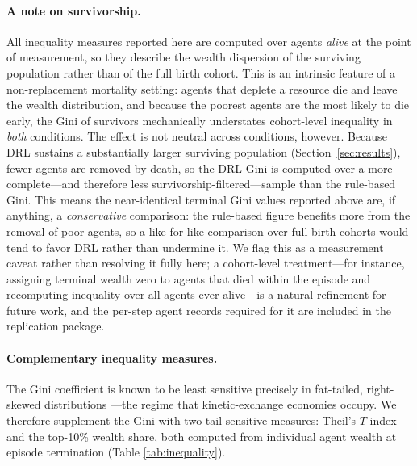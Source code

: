\documentclass[pdflatex,sn-mathphys-num]{sn-jnl}%
\theoremstyle{thmstyleone}%
\theoremstyle{thmstyletwo}%
\theoremstyle{thmstylethree}%
\begin{document}
\paragraph{A note on survivorship.}
All inequality measures reported here are computed over agents \emph{alive} at the point of measurement, so they describe the wealth dispersion of the surviving population rather than of the full birth cohort.  
This is an intrinsic feature of a non-replacement mortality setting: agents that deplete a resource die and leave the wealth distribution, and because the poorest agents are the most likely to die early, the Gini of survivors mechanically understates cohort-level inequality in \emph{both} conditions.  
The effect is not neutral across conditions, however.  
Because DRL sustains a substantially larger surviving population (Section~\ref{sec:results}), fewer agents are removed by death, so the DRL Gini is computed over a more complete---and therefore less survivorship-filtered---sample than the rule-based Gini.  
This means the near-identical terminal Gini values reported above are, if anything, a \emph{conservative} comparison: the rule-based figure benefits more from the removal of poor agents, so a like-for-like comparison over full birth cohorts would tend to favor DRL rather than undermine it.  
We flag this as a measurement caveat rather than resolving it fully here; a cohort-level treatment---for instance, assigning terminal wealth zero to agents that died within the episode and recomputing inequality over all agents ever alive---is a natural refinement for future work, and the per-step agent records required for it are included in the replication package.

\paragraph{Complementary inequality measures.}
The Gini coefficient is known to be least sensitive precisely in fat-tailed, right-skewed distributions \citep{Atkinson1970}---the regime that kinetic-exchange economies occupy.
We therefore supplement the Gini with two tail-sensitive measures: Theil's $T$ index and the top-10\% wealth share, both computed from individual agent wealth at episode termination (Table \ref{tab:inequality}).
\end{document}
